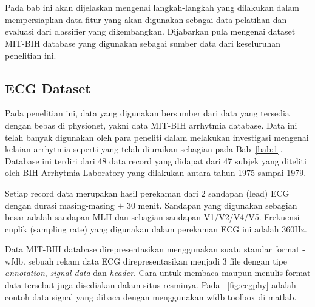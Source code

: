 \chapter{\babTiga}
Pada bab ini akan dijelaskan mengenai langkah-langkah yang dilakukan dalam
mempersiapkan data fitur yang akan digunakan sebagai data pelatihan dan evaluasi
dari classifier yang dikembangkan. Dijabarkan pula mengenai dataset MIT-BIH
database yang digunakan sebagai sumber data dari keseluruhan penelitian ini.

\section{ECG Dataset}
Pada penelitian ini, data yang digunakan bersumber dari data yang tersedia
dengan bebas di physionet, yakni data MIT-BIH arrhytmia database. Data ini telah
banyak digunakan oleh para peneliti dalam melakukan investigasi mengenai kelaian
arrhytmia seperti yang telah diuraikan sebagian pada Bab~\ref{bab:1}. Database
ini terdiri dari 48 data record yang didapat dari 47 subjek yang diteliti oleh
BIH Arrhytmia Laboratory yang dilakukan antara tahun 1975 sampai 1979. 


Setiap record data merupakan hasil perekaman dari 2 sandapan (lead) ECG dengan
durasi masing-masing $\pm$ 30 menit. Sandapan yang digunakan sebagian besar
adalah sandapan MLII dan sebagian sandapan V1/V2/V4/V5. Frekuensi cuplik
(sampling rate) yang digunakan dalam perekaman ECG ini adalah 360Hz.

Data MIT-BIH database direpresentasikan menggunakan suatu standar
format - \gls{wfdb}. sebuah rekam data ECG direpresentasikan menjadi 3 file
dengan tipe \textit{annotation}, \textit{signal data} dan \textit{header}. Cara untuk
membaca maupun menulis format data tersebut juga disediakan dalam situs
resminya. Pada \pic~\ref{fig:ecgphy} adalah contoh data signal yang dibaca
dengan menggunakan \gls{wfdb} toolbox di matlab.
 

